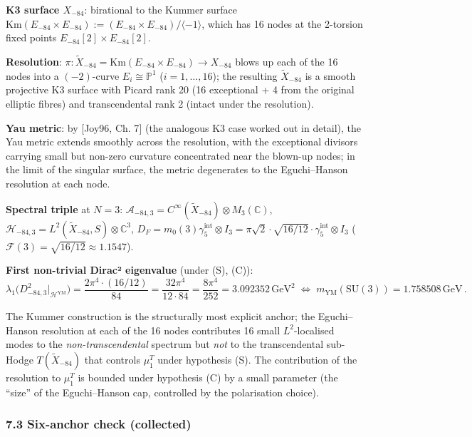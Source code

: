 \documentclass[
  11pt,
  a4paper,
]{amsart}
\begin{document}
\textbf{K3 surface \(X_{-84}\)}: birational to the Kummer surface
\(\mathrm{Km}(E_{-84} \times E_{-84}) := (E_{-84} \times E_{-84}) / \langle -1 \rangle\),
which has 16 nodes at the 2-torsion fixed points \(E_{-84}[2] \times E_{-84}[2]\).

\textbf{Resolution}: \(\pi : \widetilde{X}_{-84} = \mathrm{Km}(E_{-84} \times E_{-84}) \to X_{-84}\)
blows up each of the 16 nodes into a \((-2)\)-curve \(E_i \cong \mathbb{P}^1\)
(\(i = 1, \dots, 16\)); the resulting \(\widetilde{X}_{-84}\) is a smooth projective
K3 surface with Picard rank 20 (16 exceptional + 4 from the original elliptic
fibres) and transcendental rank 2 (intact under the resolution).

\textbf{Yau metric}: by {[}Joy96, Ch. 7{]} (the analogous K3 case worked out in detail),
the Yau metric extends smoothly across the resolution, with the exceptional
divisors carrying small but non-zero curvature concentrated near the blown-up
nodes; in the limit of the singular surface, the metric degenerates to the
Eguchi--Hanson resolution at each node.

\textbf{Spectral triple} at \(N = 3\):
\(\mathcal{A}_{-84,3} = C^\infty(\widetilde{X}_{-84}) \otimes M_3(\mathbb{C})\),
\(\mathcal{H}_{-84,3} = L^2(\widetilde{X}_{-84}, S) \otimes \mathbb{C}^3\),
\(D_F = m_0(3) \gamma_5^{\mathrm{int}} \otimes I_3 = \pi\sqrt{2}\cdot\sqrt{16/12}\cdot \gamma_5^{\mathrm{int}} \otimes I_3\)
(\(\mathcal{F}(3) = \sqrt{16/12} \approx 1.1547\)).

\textbf{First non-trivial Dirac² eigenvalue} (under (S), (C)):
\[
\lambda_1\bigl(D_{-84,3}^2\big|_{\mathcal{H}^{\mathrm{YM}}}\bigr) = \frac{2\pi^4 \cdot (16/12)}{84} = \frac{32\pi^4}{12 \cdot 84} = \frac{8\pi^4}{252} = 3.092352\, \mathrm{GeV}^2 \;\Longleftrightarrow\; m_{\mathrm{YM}}(\mathrm{SU}(3)) = 1.758508\, \mathrm{GeV}\,.
\]

The Kummer construction is the structurally most explicit anchor; the
Eguchi--Hanson resolution at each of the 16 nodes contributes 16 small
\(L^2\)-localised modes to the \emph{non-transcendental} spectrum but \emph{not} to the
transcendental sub-Hodge \(T(\widetilde{X}_{-84})\) that controls \(\mu_1^T\) under
hypothesis (S). The contribution of the resolution to \(\mu_1^T\) is bounded
under hypothesis (C) by a small parameter (the ``size'' of the Eguchi--Hanson cap,
controlled by the polarisation choice).

\hypertarget{six-anchor-check-collected}{%
\subsubsection{7.3 Six-anchor check (collected)}\label{six-anchor-check-collected}}
\end{document}
